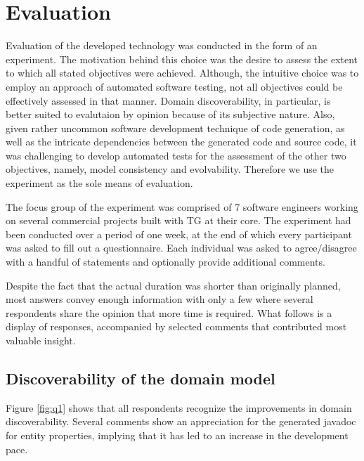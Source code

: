 \chapter{Evaluation}\label{chap:eval}

Evaluation of the developed technology was conducted in the form of an experiment.
The motivation behind this choice was the desire to assess the extent to which all stated objectives were achieved.
Although, the intuitive choice was to employ an approach of automated software testing, not all objectives could be effectively assessed in that manner.
Domain discoverability, in particular, is better suited to evalutaion by opinion because of its subjective nature. 
Also, given rather uncommon software development technique of code generation, as well as the intricate dependencies between the generated code and source code, it was challenging to develop automated tests for the assessment of the other two objectives, namely, model consistency and evolvability. 
Therefore we use the experiment as the sole means of evaluation.

\n

The focus group of the experiment was comprised of 7 software engineers working on several commercial projects built with TG at their core.
The experiment had been conducted over a period of one week, at the end of which every participant was asked to fill out a questionnaire.
Each individual was asked to agree/disagree with a handful of statements and optionally provide additional comments.

\n

Despite the fact that the actual duration was shorter than originally planned, most answers convey enough information with only a few where several respondents share the opinion that more time is required. 
What follows is a display of responses, accompanied by selected comments that contributed most valuable insight.

\pagebreak
\section{Discoverability of the domain model}
\noindent Figure \ref{fig:q1} shows that all respondents recognize the improvements in domain discoverability.
Several comments show an appreciation for the generated javadoc for entity properties, implying that it has led to an increase in the development pace.


